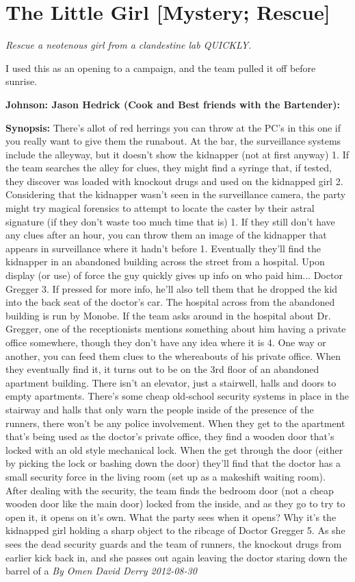 \documentclass[letterpaper,twocolumn,10.5pt]{article}
\newenvironment{scenario}[6]
	{
		\section{#1 {\small[#2]}}
		\textit{#3}
		\def\TMPSCENARIO{#4 #5}
	}
	{\small\textit{By \TMPSCENARIO}}
\newcommand{\johnson}[2]{\textbf{Johnson: #1 (#2):}}
\newcommand{\synopsis}{\textbf{Synopsis: }}
\begin{document}
\begin{scenario}{The Little Girl}
	{Mystery; Rescue}
	{ Rescue a neotenous girl from a clandestine lab QUICKLY.}
	{Omen David Derry}
	{2012-08-30}
	{https://forum.rpg.net/showthread.php?321504-Shadowrun-4th-101-Instant-Scenarios\&p=15841535#post15841535}

 I used this as an opening to a campaign, and the team pulled it off before sunrise.

\johnson{Jason Hedrick}{Cook and Best friends with the Bartender} 

\synopsis  There's allot of red herrings you can throw at the PC's in this one if you really want to give them the runabout. At the bar, the surveillance systems include the alleyway, but it doesn't show the kidnapper (not at first anyway) 1. If the team searches the alley for clues, they might find a syringe that, if tested, they discover was loaded with knockout drugs and used on the kidnapped girl 2. Considering that the kidnapper wasn't seen in the surveillance camera, the party might try magical forensics to attempt to locate the caster by their astral signature (if they don't waste too much time that is) 1. If they still don't have any clues after an hour, you can throw them an image of the kidnapper that appears in surveillance where it hadn't before 1. Eventually they'll find the kidnapper in an abandoned building across the street from a hospital. Upon display (or use) of force the guy quickly gives up info on who paid him... Doctor Gregger 3. If pressed for more info, he'll also tell them that he dropped the kid into the back seat of the doctor's car. The hospital across from the abandoned building is run by Monobe. If the team asks around in the hospital about Dr. Gregger, one of the receptionists mentions something about him having a private office somewhere, though they don't have any idea where it is 4. One way or another, you can feed them clues to the whereabouts of his private office. When they eventually find it, it turns out to be on the 3rd floor of an abandoned apartment building. There isn't an elevator, just a stairwell, halls and doors to empty apartments. There's some cheap old-school security systems in place in the stairway and halls that only warn the people inside of the presence of the runners, there won't be any police involvement. When they get to the apartment that's being used as the doctor's private office, they find a wooden door that's locked with an old style mechanical lock. When the get through the door (either by picking the lock or bashing down the door) they'll find that the doctor has a small security force in the living room (set up as a makeshift waiting room). After dealing with the security, the team finds the bedroom door (not a cheap wooden door like the main door) locked from the inside, and as they go to try to open it, it opens on it's own. What the party sees when it opens? Why it's the kidnapped girl holding a sharp object to the ribcage of Doctor Gregger 5. As she sees the dead security guards and the team of runners, the knockout drugs from earlier kick back in, and she passes out again leaving the doctor staring down the barrel of a 
\end{scenario}
\end{document}
